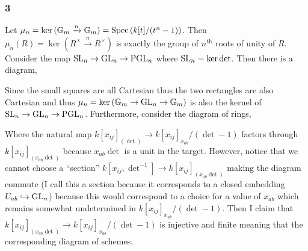 \documentclass[12pt]{article}
\begin{document}
\subsubsection{3} 


Let $\mu_n = \ker{({\mathbb{G}_m}\xrightarrow{n} {\mathbb{G}_m})} = \mathrm{Spec}\left( k[t]/(t^n - 1) \right)$. Then $\mu_n(R) = \ker{(R^\times \xrightarrow{n} R^\times)}$ is exactly the group of $n^{\text{th}}$ roots of unity of $R$. Consider the map $\mathrm{SL}_n \to \mathrm{GL}_n \to \mathrm{PGL}_n$ where $\mathrm{SL}_n = \ker{\det}$. Then there is a diagram,
\begin{center}
\end{center}
Since the small squares are all Cartesian thus the two rectangles are also Cartesian and thus $\mu_n = \ker{({\mathbb{G}_m}\to \mathrm{GL}_n \to {\mathbb{G}_m})}$ is also the kernel of $\mathrm{SL}_n \to \mathrm{GL}_n \to \mathrm{PGL}_n$. Furthermore, consider the diagram of rings,
\begin{center}
\end{center}
Where the natural map $k[x_{ij}]_{(\det)} \to k[x_{ij}]_{x_{ab}}/(\det - 1)$ factors through $k[x_{ij}]_{(x_{ab}\det)}$ because $x_{ab} \det$ is a unit in the target. However, notice that we cannot choose a ``section'' $k[x_{ij}, \det^{-1}] \to k[x_{ij}]_{(x_{ab} \det)}$ making the diagram commute (I call this a section because it corresponds to a closed embedding $U_{ab} \hookrightarrow \mathrm{GL}_n$) because this would correspond to a choice for a value of $x_{ab}$ which remains somewhat undetermined in $k[x_{ij}]_{x_{ab}}/(\det - 1)$. Then I claim that $k[x_{ij}]_{(x_{ab} \det)} \to k[x_{ij}]_{x_{ab}}/(\det - 1)$ is injective and finite meaning that the corresponding diagram of schemes,
\begin{center}
\end{center}
\end{document}
